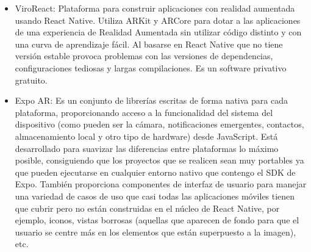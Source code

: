 \begin{itemize}
\item ViroReact\cite{viroreact}:
Plataforma para construir aplicaciones con realidad aumentada usando React Native.
 Utiliza ARKit y ARCore para dotar a las aplicaciones de una experiencia de Realidad Aumentada sin
 utilizar código distinto y con una curva de aprendizaje fácil. Al basarse en React
 Native que no tiene versión estable provoca problemas con las versiones de dependencias,
 configuraciones tediosas y largas compilaciones.
Es un software privativo gratuito.

\item Expo AR\cite{expoar}:
Es un conjunto de librerías escritas de forma nativa para cada plataforma, proporcionando acceso a la funcionalidad del sistema del
dispositivo (como pueden ser la cámara, notificaciones emergentes, contactos, almacenamiento local y otro tipo de hardware) desde JavaScript. Está 
desarrollado para suavizar las diferencias entre plataformas lo máximo posible, consiguiendo que los proyectos que se realicen sean muy portables ya que pueden
ejecutarse en cualquier entorno nativo que contengo el SDK de Expo.
También proporciona componentes de interfaz de usuario para manejar una variedad de casos de uso que casi todas las aplicaciones móviles tienen que cubrir pero no están
construidas en el núcleo de React Native, por ejemplo, iconos, vistas borrosas (aquellas que aparecen de fondo para que el usuario se centre más en los elementos que están superpuesto a la imagen), etc.
\end{itemize}


